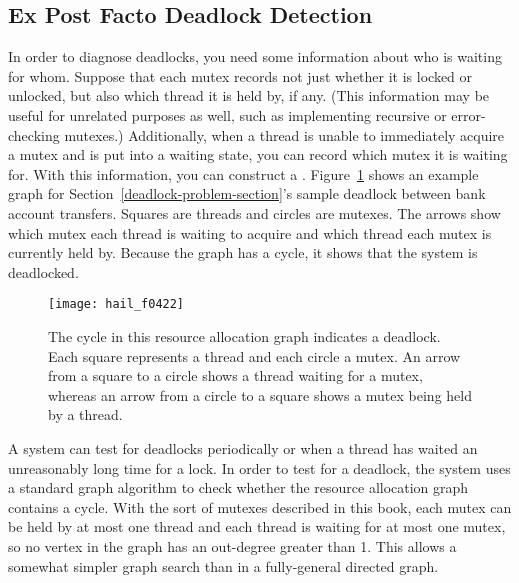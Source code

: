 \subsection{Ex Post Facto Deadlock Detection}\label{post-facto-dd-section}
In order to diagnose deadlocks, you need some information about who is
waiting for whom.  Suppose that each mutex records not just whether it
is locked or unlocked, but also which thread it is held by, if any.
(This information may be useful for unrelated purposes as well, such
as implementing recursive or error-checking mutexes.)  Additionally,
when a thread is unable to immediately acquire a mutex and is put
into a waiting state, you can record which mutex it is waiting for.
With this information, you can construct a .
Figure~\ref{resource-allocation-graph} shows an example graph for
Section~\ref{deadlock-problem-section}'s sample deadlock between bank account transfers.
Squares are threads and circles are mutexes.  The arrows show which
mutex each thread is waiting to acquire and which thread each mutex
is currently held by.
Because the graph has a cycle, it shows that the system is deadlocked.
\begin{figure}
\centerline{\texttt{[image: hail\_f0422]}}
\iffalse
\centerline{\begin{graph}(294,94)(-43,3)
\graphnodesize{10}
\graphlinecolour{0}
\graphlinewidth{0.5}
\grapharrowlength{5}
\graphnodecolour{0}
\fillednodestrue
\roundnode{myMutex}(50,50)
\roundnode{yourMutex}(150,50)
\squarenode{myTransfer}(100,80)
\squarenode{yourTransfer}(100,20)
\autonodetext{myMutex}[w]{myAccount.mutex}
\autonodetext{yourMutex}[e]{yourAccount.mutex}
\autonodetext{myTransfer}[n]{my transfer to you}
\autonodetext{yourTransfer}[s]{your transfer to me}
\diredge{myTransfer}{yourMutex}
\diredge{yourMutex}{yourTransfer}
\diredge{yourTransfer}{myMutex}
\diredge{myMutex}{myTransfer}
\end{graph}}
\fi
\caption{The cycle in this resource allocation graph indicates a
  deadlock.  Each square represents a thread and each circle a mutex.
  An arrow from a square to a circle shows a thread waiting for a
  mutex, whereas an arrow from a circle to a square shows a mutex
  being held by a thread.}
\label{resource-allocation-graph}
\end{figure}

A system can test for deadlocks periodically or when a thread has
waited an unreasonably long time for a lock.  In order to test for a
deadlock, the system uses a standard graph algorithm to check whether
the resource allocation graph contains a cycle. With the sort of
mutexes described in this book, each mutex can be held by at most
one thread and each thread is waiting for at most one mutex, so no
vertex in the graph has an out-degree greater than 1.  This allows a
somewhat simpler graph search than in a fully-general directed graph.

